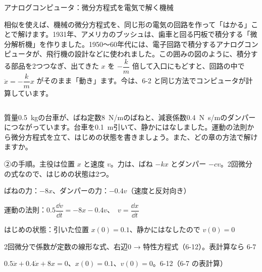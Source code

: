 \begin{column}{アナログコンピュータ：微分方程式を電気で解く機械}
\noindent\begin{minipage}[c]{0.5\linewidth}
\raggedright
相似を使えば、機械の微分方程式を、同じ形の電気の回路を作って「はかる」ことで解けます。1931年、アメリカのブッシュは、歯車と回る円板で積分する「微分解析機」を作りました。1950〜60年代には、電子回路で積分するアナログコンピュータが、飛行機の設計などに使われました。この囲みの図のように、積分する部品を2つつなぎ、出てきた $x$ を $-\dfrac km$ 倍して入口にもどすと、回路の中で $\ddot x=-\dfrac km x$ がそのまま「動き」ます。今は、6-2 と同じ方法でコンピュータが計算しています。
\end{minipage}\hfill
\begin{minipage}[c]{0.46\linewidth}
\centering
{}
\end{minipage}
\end{column}




\begin{reidai}
質量\qty{0.5}{kg}の台車が、ばね定数\qty{8}{N/m}のばねと、減衰係数\qty{0.4}{N.s/m}のダンパーにつながっています。台車を\qty{0.1}{m}引いて、静かにはなしました。運動の法則から微分方程式を立て、はじめの状態を書きましょう。また、どの章の方法で解けますか。\par
\kangaekata ②の手順。主役は位置 $x$ と速度 $v$。力は、ばね $-kx$ とダンパー $-cv$。2回微分の式なので、はじめの状態は2つ。\par
\shiki\kvips{}\zw{} ばねの力：$-8x$、ダンパーの力：$-0.4v$（速度と反対向き）\par
\kvipa 運動の法則：$0.5\dfrac{\dd v}{\dd t}=-8x-0.4v$、\ $v=\dfrac{\dd x}{\dd t}$\par
\kvipa はじめの状態：引いた位置 $x(0)=0.1$、静かにはなしたので $v(0)=0$\par
\kvipa 2回微分で係数が定数の線形な式、右辺0 → 特性方程式（6-12）。表計算なら 6-7\par
\kotae\kvips{}\zw{} $0.5\ddot x+0.4\dot x+8x=0$、$x(0)=0.1$、$v(0)=0$。6-12（6-7 の表計算）
\end{reidai}

